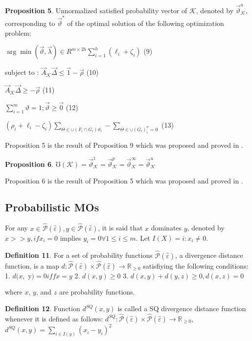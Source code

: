 \documentclass[]{iosart2c}
\begin{document}
  \textbf{Proposition 5}. Unnormalized satisfied probability vector of $\mathcal{K}$, denoted by $\vec{\vartheta}^u_\mathcal{K}$, corresponding to $\vec{\vartheta}^*$ of the optimal solution of the following optimization problem:

  $\arg \min(\vec{\vartheta},\vec{\lambda})\in R^{m \times 2h}\sum^h_{i=1}(\ell_i + \zeta_i)$ (9)

  subject to : $\vec{A}_\mathcal{K} \vec{\Delta} \le \vec{1} - \vec{\rho}$ (10)

  $\vec{A}_\mathcal{K} \vec\Delta\geq -\vec{\rho}$ (11)

  $\sum^m_{i=1} \vartheta = 1;\vec{\vartheta}\geq\vec{0}$ (12)

  $(\rho_i + \ell_i - \zeta_i)\sum_{\Theta \in \cup(F_i \cap G_i)\vartheta_i} - \sum_{\Theta\in\cup(G_i)^\vartheta_i=0}$ (13)

  Proposition 5 is the result of Proposition 9 which was proposed and proved in \cite{10}.

  \textbf{Proposition 6}. $\mho(\mathcal{K}) = \vec{\vartheta}^1_\mathcal{K} = \vec{\vartheta}^p_\mathcal{K} = \vec{\vartheta}^\infty_\mathcal{K} = \vec{\vartheta}^u_\mathcal{K}$

  Proposition 6 is the result of Proposition 5 which was proposed and proved in \cite{24}.

  \subsection{Probabilistic MOs}

  For any $x \in \hat{\mathcal{P}}(\hat{\varepsilon}), y \in \hat{\mathcal{P}}(\hat{\varepsilon})$, it is said that $x$ dominates $y$, denoted by $x >> y, if x_i = 0$ implies $y_i = 0 \forall 1 \le i \le m$. Let $I(X) = {i : x_i \neq 0}$.

  \textbf{Definition 11}. For a set of probability functions $\hat{\mathcal{P}} (\hat{\varepsilon})$, a divergence distance function, is a map $d : \hat{\mathcal{P}} (\hat{\varepsilon}) \times \hat{\mathcal{P}} (\hat{\varepsilon}) \to \mathbb{R}_{\geq0}$ satisfiying the following conditions:
  1. $d(x,$ y$) = 0 iff x = y$
  2. $d(x, y) \geq 0$
  3. $d(x, y) + d(y, z)\ge0, d(x, z) = 0$

  where $x$, $y$, and $z$ are probability functions.

  \textbf{Definition 12}. Function $d^{SQ}(x, y)$ is called a SQ divergence distance function whenever it is defined as follows: $d^{SQ} : \hat{\mathcal{P}} (\hat{\varepsilon}) \times \hat{\mathcal{P}} (\hat{\varepsilon}) \to \mathbb{R}_{\geq0}$, $d^{SQ}(x, y) = \sum_{i \in I(y)} (x_i - y_i)^2$
\end{document}
